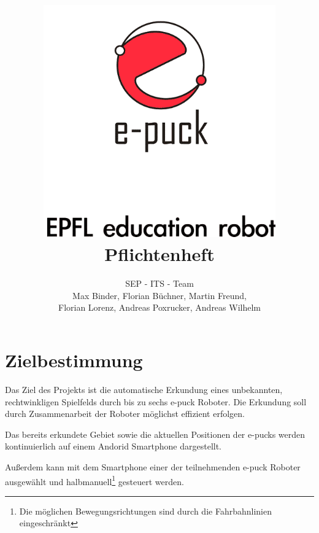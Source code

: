 \documentclass[10pt,a4paper]{article}
\title{
	\includegraphics[width=10cm]{logo.png} \\
	\vspace{1cm}
	Pflichtenheft
}
\author{SEP - ITS - Team \\ Max Binder, Florian Büchner, Martin Freund, \\Florian Lorenz,
											Andreas Poxrucker, Andreas Wilhelm}
\begin{document}
	\maketitle
	\newpage
	\tableofcontents	
	\newpage
	
	\section{Zielbestimmung}
		Das Ziel des Projekts ist die automatische Erkundung eines unbekannten, rechtwinkligen Spielfelds durch bis zu
		sechs e-puck Roboter. Die Erkundung soll durch Zusammenarbeit der Roboter möglichst effizient erfolgen.
		
		Das bereits erkundete Gebiet sowie die aktuellen Positionen der e-pucks werden kontinuierlich auf einem
		Andorid Smartphone dargestellt.
		
		Außerdem kann mit dem Smartphone einer der teilnehmenden e-puck Roboter ausgewählt und halbmanuell\footnote{Die
			möglichen Bewegungsrichtungen sind durch die Fahrbahnlinien eingeschränkt}  gesteuert werden.
\end{document}

